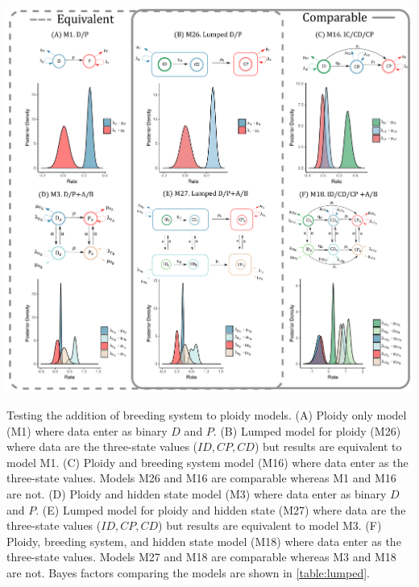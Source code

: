 \begin{suppfigure}
\includegraphics[width=\textwidth]{figS15.pdf}
\caption{Testing the addition of breeding system to ploidy models. (A) Ploidy only model (M1) where data enter as binary $D$ and $P$. (B) Lumped model for ploidy (M26) where data are the three-state values ($ID,CP,CD$) but results are equivalent to model M1.  (C) Ploidy and breeding system model (M16) where  data enter as the three-state values. Models M26 and M16 are comparable whereas M1 and M16 are not. (D) Ploidy and hidden state model (M3) where data enter as binary $D$ and $P$. (E) Lumped model for ploidy and hidden state (M27) where data are the three-state values ($ID,CP,CD$) but results are equivalent to model M3. (F) Ploidy, breeding system, and hidden state model (M18) where  data enter as the three-state values. Models M27 and M18 are comparable whereas M3 and M18 are not. Bayes factors comparing the models are shown in \cref{table:lumped}.} %
\label{suppfigure:lumpedDP}
\end{suppfigure}

